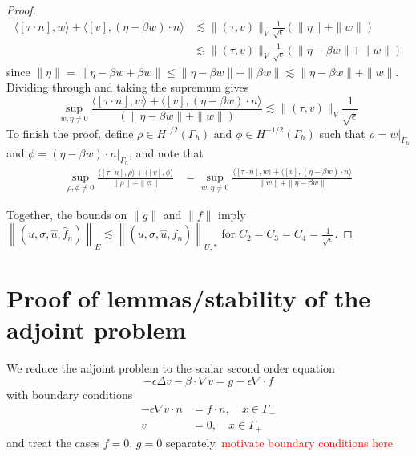 \documentclass[11pt,onecolumn]{scrartcl}
\newcommand{\grad}{\nabla}
\renewcommand{\div}{\grad \cdot}
\begin{document}
\begin{proof}
\begin{align*}
\langle [\tau\cdot n],w\rangle + \langle [v],\left(\eta - \beta w\right)\cdot n\rangle &\lesssim \|\left(\tau,v\right)\|_V\frac{1}{\sqrt{\epsilon}}\left(\|\eta\| + \|w\|\right)\\
&\lesssim \|\left(\tau,v\right)\|_V\frac{1}{\sqrt{\epsilon}}\left(\|\eta-\beta w\| + \|w\|\right)
\end{align*}
since $\|\eta\| = \|\eta - \beta w + \beta w\| \leq \|\eta - \beta w\| + \|\beta w\| \lesssim \|\eta-\beta w\| + \|w\|$.  Dividing through and taking the supremum gives
\[
\sup_{w,\eta \neq 0} \frac{\langle[\tau\cdot n],w\rangle + \langle [v],\left(\eta - \beta w\right)\cdot n\rangle}{\left(\|\eta-\beta w\| + \|w\|\right)} \lesssim \|\left(\tau,v\right)\|_V\frac{1}{\sqrt{\epsilon}}
\]
To finish the proof, define $\rho \in H^{1/2}(\Gamma_h)$ and $\phi \in H^{-1/2}(\Gamma_h)$ such that $\rho = \left.w\right|_{\Gamma_h}$ and $\phi = \left.(\eta-\beta w)\cdot n\right|_{\Gamma_h}$, and note that
\begin{align*}
\sup_{\rho,\phi \neq 0} \frac{\langle [\tau\cdot n],\rho\rangle + \langle [v],\phi \rangle}{\|\rho\|+\|\phi\|} &= \sup_{w,\eta \neq 0} \frac{\langle [\tau\cdot n],w\rangle + \langle [v],\left(\eta - \beta w\right)\cdot n\rangle}{ \|w\|+\|\eta-\beta w\|} 
\end{align*}

Together, the bounds on $\|g\|$ and $\|f\|$ imply $\left\|\left(u,\sigma,\widehat{u},\widehat{f}_n\right)\right\|_{E} \lesssim \left\|\left(u,\sigma,\widehat{u},\widehat{f}_n\right)\right\|_{U,*}$ for $C_2 = C_3 = C_4 = \frac{1}{\sqrt{\epsilon}}$.  
\end{proof}


\section{Proof of lemmas/stability of the adjoint problem}

We reduce the adjoint problem to the scalar second order equation
\begin{equation}
- \epsilon \Delta v - \beta \cdot \grad v = g - \epsilon \div f \label{adjoint}
\end{equation}
with boundary conditions
\begin{align}
- \epsilon \grad v \cdot n &=f\cdot n, \quad x\in \Gamma_- \label{bc_1}\\ 
v &= 0, \quad x\in \Gamma_+ \label{bc_2}
\end{align}
and treat the cases $f=0$, $g=0$ separately.  %
\textcolor{red}{motivate boundary conditions here}
\end{document}

